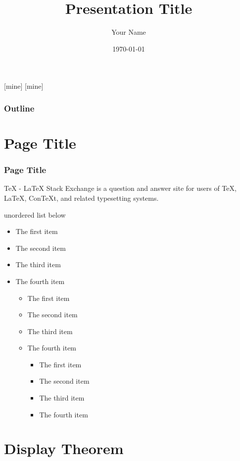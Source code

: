 \documentclass[10pt]{beamer}
\author{Your Name}
\title{Presentation Title}
\date{\today}
\begin{document}
[mine]
[mine]

\frame[plain]{\titlepage}

\begin{frame}
\frametitle{Outline}
\tableofcontents
\end{frame}

\section{Page Title}

\begin{frame}
\sectionpage
\end{frame}

\begin{frame}
\frametitle{Page Title}

TeX - LaTeX Stack Exchange is a question and answer site for users of TeX, LaTeX, ConTeXt, and related typesetting systems.

\vspace{0.4cm}

unordered list below

\begin{itemize}
\item The first item
\item The second item
\item The third item
\item The fourth item
\begin{itemize}
\item The first item
\item The second item
\item The third item
\item The fourth item
\begin{itemize}
\item The first item
\item The second item
\item The third item
\item The fourth item
\end{itemize}
\end{itemize}
\end{itemize}

\end{frame}

\section{Display Theorem}
\end{document}
